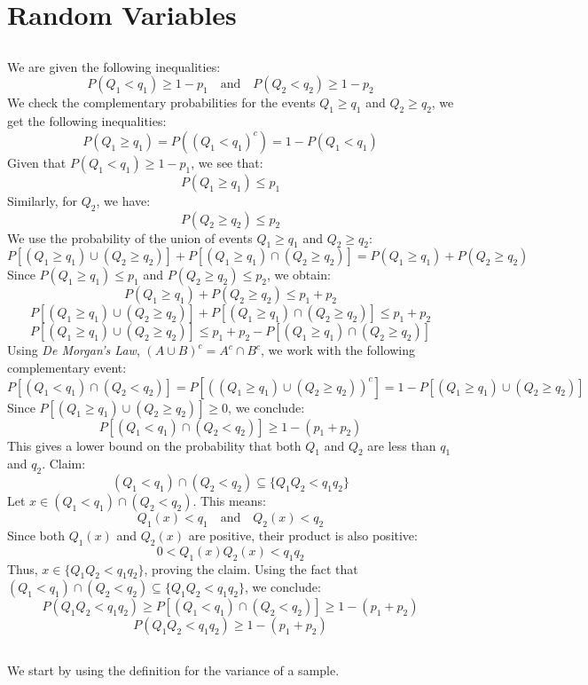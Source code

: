 \section{Random Variables}
\subsection{}
We are given the following inequalities:
\[
	P(Q_1 < q_1) \geq 1 - p_1 \quad \text{and} \quad P(Q_2 < q_2) \geq 1 - p_2
\]
We check the complementary probabilities for the events \( Q_1 \geq q_1 \) and \( Q_2 \geq q_2 \), we get the following inequalities:
\[
	P(Q_1 \geq q_1) = P((Q_1 < q_1)^c) = 1 - P(Q_1 < q_1)
\]
Given that \( P(Q_1 < q_1) \geq 1 - p_1 \), we see that:
\[
	P(Q_1 \geq q_1) \leq p_1
\]
Similarly, for \( Q_2 \), we have:
\[
	P(Q_2 \geq q_2) \leq p_2
\]
We use the probability of the union of events \( Q_1 \geq q_1 \) and \( Q_2 \geq q_2 \):
\[
	P[(Q_1 \geq q_1) \cup (Q_2 \geq q_2)] + P[(Q_1 \geq q_1) \cap (Q_2 \geq q_2)] = P(Q_1 \geq q_1) + P(Q_2 \geq q_2)
\]
Since \( P(Q_1 \geq q_1) \leq p_1 \) and \( P(Q_2 \geq q_2) \leq p_2 \), we obtain:
\[
	P(Q_1 \geq q_1) + P(Q_2 \geq q_2) \leq p_1 + p_2
\]
\[
	P[(Q_1 \geq q_1) \cup (Q_2 \geq q_2)] + P[(Q_1 \geq q_1) \cap (Q_2 \geq q_2)] \leq p_1 + p_2
\]
\[
	P[(Q_1 \geq q_1) \cup (Q_2 \geq q_2)] \leq p_1 + p_2 - P[(Q_1 \geq q_1) \cap (Q_2 \geq q_2)]
\]
Using \textit{De Morgan’s Law},  \( (A \cup B)^c = A^c \cap B^c \), we work with the following complementary event:
\[
	P[(Q_1 < q_1) \cap (Q_2 < q_2)] = P[((Q_1 \geq q_1) \cup (Q_2 \geq q_2))^c] = 1 - P[(Q_1 \geq q_1) \cup (Q_2 \geq q_2)]
\]
Since \( P[(Q_1 \geq q_1) \cup (Q_2 \geq q_2)] \geq 0 \), we conclude:
\[
	P[(Q_1 < q_1) \cap (Q_2 < q_2)] \geq 1 - (p_1 + p_2)
\]
This gives a lower bound on the probability that both \( Q_1 \) and \( Q_2 \) are less than \( q_1 \) and \( q_2 \).
Claim:
\[
	(Q_1 < q_1) \cap (Q_2 < q_2) \subseteq \{ Q_1 Q_2 < q_1 q_2 \}
\]
Let \( x \in (Q_1 < q_1) \cap (Q_2 < q_2) \). This means:
\[
	Q_1(x) < q_1 \quad \text{and} \quad Q_2(x) < q_2
\]
Since both \( Q_1(x) \) and \( Q_2(x) \) are positive, their product is also positive:
\[
	0 < Q_1(x) Q_2(x) < q_1 q_2
\]
Thus, \( x \in \{ Q_1 Q_2 < q_1 q_2 \} \), proving the claim.
Using the fact that \( (Q_1 < q_1) \cap (Q_2 < q_2) \subseteq \{ Q_1 Q_2 < q_1 q_2 \} \), we conclude:
\[
	P(Q_1 Q_2 < q_1 q_2) \geq P[(Q_1 < q_1) \cap (Q_2 < q_2)] \geq 1 - (p_1 + p_2)
\]
\[
	P(Q_1 Q_2 < q_1 q_2) \geq 1 - (p_1 + p_2)
\]

\subsection{}
We start by using the definition for the variance of a sample.

